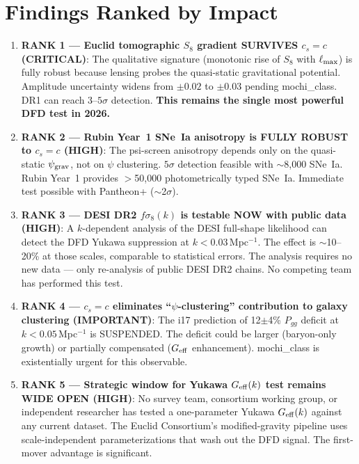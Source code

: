 \documentclass[11pt,a4paper]{article}
\newcommand{\Geff}{G_{\rm eff}}
\begin{document}
\section{Findings Ranked by Impact}
\label{sec:ranking}

\begin{enumerate}

\item \textbf{RANK 1 --- Euclid tomographic $S_8$ gradient SURVIVES
  $c_s = c$ (CRITICAL)}:
  The qualitative signature (monotonic rise of $S_8$ with
  $\ell_{\rm max}$) is fully robust because lensing probes the
  quasi-static gravitational potential. Amplitude uncertainty
  widens from $\pm 0.02$ to $\pm 0.03$ pending mochi\_class.
  DR1 can reach $3$--$5\sigma$ detection.
  \textbf{This remains the single most powerful DFD test in 2026.}

\item \textbf{RANK 2 --- Rubin Year~1 SNe~Ia anisotropy is FULLY
  ROBUST to $c_s = c$ (HIGH)}:
  The psi-screen anisotropy depends only on the quasi-static
  $\psi_{\rm grav}$, not on $\psi$ clustering. $5\sigma$ detection
  feasible with $\sim$8,000 SNe~Ia. Rubin Year~1 provides
  $>$50,000 photometrically typed SNe~Ia. Immediate test possible
  with Pantheon+ ($\sim$2$\sigma$).

\item \textbf{RANK 3 --- DESI DR2 $f\sigma_8(k)$ is testable NOW
  with public data (HIGH)}:
  A $k$-dependent analysis of the DESI full-shape likelihood can
  detect the DFD Yukawa suppression at $k < 0.03$\,Mpc$^{-1}$.
  The effect is $\sim$10--20\% at those scales, comparable to
  statistical errors. The analysis requires no new data --- only
  re-analysis of public DESI DR2 chains. No competing team has
  performed this test.

\item \textbf{RANK 4 --- $c_s = c$ eliminates ``$\psi$-clustering''
  contribution to galaxy clustering (IMPORTANT)}:
  The i17 prediction of 12$\pm$4\% $P_{gg}$ deficit at
  $k < 0.05$\,Mpc$^{-1}$ is SUSPENDED. The deficit could be larger
  (baryon-only growth) or partially compensated ($\Geff$ enhancement).
  mochi\_class is existentially urgent for this observable.

\item \textbf{RANK 5 --- Strategic window for Yukawa $\Geff(k)$ test
  remains WIDE OPEN (HIGH)}:
  No survey team, consortium working group, or independent researcher
  has tested a one-parameter Yukawa $\Geff(k)$ against any current
  dataset. The Euclid Consortium's modified-gravity pipeline uses
  scale-independent parameterizations that wash out the DFD signal.
  The first-mover advantage is significant.

\end{enumerate}
\end{document}
